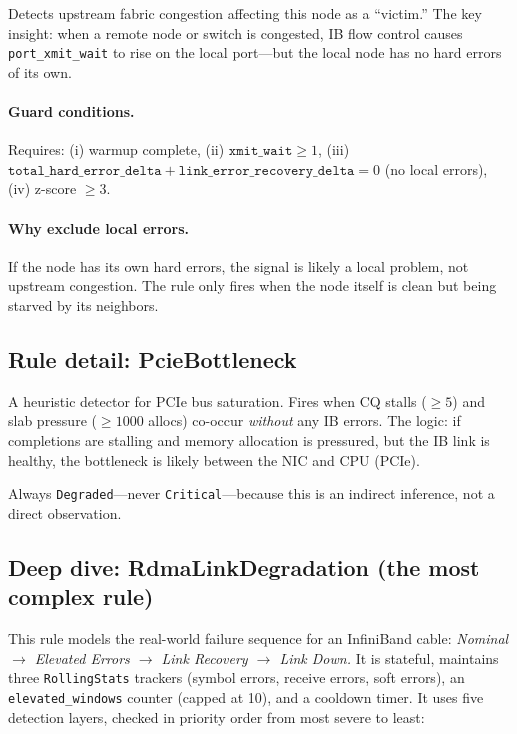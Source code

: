 \documentclass[11pt]{article}
\begin{document}
Detects upstream fabric congestion affecting this node as a ``victim.''
The key insight: when a remote node or switch is congested, IB flow control
causes \texttt{port\_xmit\_wait} to rise on the local port---but the local
node has no hard errors of its own.

\paragraph{Guard conditions.}
Requires: (i) warmup complete, (ii) $\texttt{xmit\_wait} \geq 1$, (iii)
$\texttt{total\_hard\_error\_delta} + \texttt{link\_error\_recovery\_delta}
= 0$ (no local errors), (iv) z-score $\geq 3$.

\paragraph{Why exclude local errors.}
If the node has its own hard errors, the signal is likely a local problem,
not upstream congestion. The rule only fires when the node itself is clean
but being starved by its neighbors.

\subsection{Rule detail: PcieBottleneck}

A heuristic detector for PCIe bus saturation. Fires when CQ stalls
($\geq 5$) and slab pressure ($\geq 1000$ allocs) co-occur \emph{without}
any IB errors. The logic: if completions are stalling and memory allocation
is pressured, but the IB link is healthy, the bottleneck is likely between
the NIC and CPU (PCIe).

Always \texttt{Degraded}---never \texttt{Critical}---because this is an
indirect inference, not a direct observation.

\subsection{Deep dive: RdmaLinkDegradation (the most complex rule)}
\label{sec:link-deg}

This rule models the real-world failure sequence for an InfiniBand cable:
\textit{Nominal $\rightarrow$ Elevated Errors $\rightarrow$ Link Recovery
$\rightarrow$ Link Down.} It is stateful, maintains three
\texttt{RollingStats} trackers (symbol errors, receive errors, soft errors),
an \texttt{elevated\_windows} counter (capped at 10), and a cooldown timer.
It uses five detection layers, checked in priority order from most severe to
least:
\end{document}

